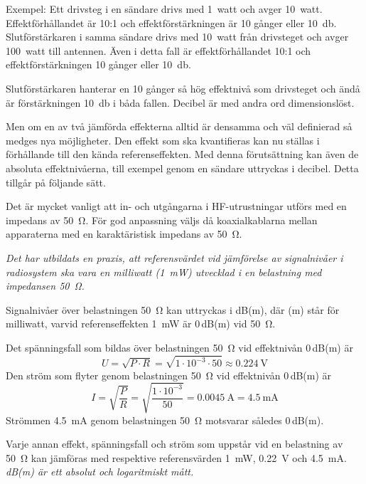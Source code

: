 Exempel: Ett drivsteg i en sändare drivs med 1~watt och avger 10~watt.
Effektförhållandet är 10:1 och effektförstärkningen är 10 gånger eller
\qty{10}{\decibel}.
Slutförstärkaren i samma sändare drivs med 10~watt från drivsteget och avger
100~watt till antennen.
Även i detta fall är effektförhållandet 10:1 och effektförstärkningen 10 gånger
eller \qty{10}{\decibel}.

Slutförstärkaren hanterar en 10 gånger så hög effektnivå som drivsteget och ändå
är förstärkningen \qty{10}{\decibel} i båda fallen.
Decibel är med andra ord dimensionslöst.

Men om en av två jämförda effekterna alltid är densamma och väl definierad så
medges nya möjligheter.
Den effekt som ska kvantifieras kan nu ställas i förhållande till den kända
referenseffekten.
Med denna förutsättning kan även de absoluta effektnivåerna, till exempel genom
en sändare uttryckas i decibel.
Detta tillgår på följande sätt.

Det är mycket vanligt att in- och utgångarna i HF-utrustningar utförs
med en impedans av \qty{50}{\ohm}.
För god anpassning väljs då koaxialkablarna mellan apparaterna med en
karaktäristisk impedans av \qty{50}{\ohm}.

\emph{Det har utbildats en praxis, att referensvärdet vid jämförelse
  av signalnivåer i radiosystem ska vara en milliwatt (\qty{1}{\milli\watt})
  utvecklad i en belastning med impedansen \qty{50}{\ohm}.}

Signalnivåer över belastningen \qty{50}{\ohm} kan uttryckas i dB(m), där (m)
står för milliwatt, varvid referenseffekten \qty{1}{\milli\watt} är 0\,dB(m) vid
\qty{50}{\ohm}.

Det spänningsfall som bildas över belastningen \qty{50}{\ohm} vid effektnivån
0\,dB(m) är
\[U = \sqrt{P\cdot R} = \sqrt{1\cdot 10^{-3} \cdot 50} \approx \qty{0.224}{\volt}\]
Den ström som flyter genom belastningen \qty{50}{\ohm} vid effektnivån 0\,dB(m)
är
\[
I = \sqrt{\frac{P}{R}} = \sqrt{\frac{1\cdot 10^{-3}}{50}} = \qty{0.0045}{\ampere} = \qty{4.5}{\milli\ampere}
\]
Strömmen \qty{4,5}{\milli\ampere} genom belastningen \qty{50}{\ohm} motsvarar
således 0\,dB(m).

Varje annan effekt, spänningsfall och ström som uppstår vid en belastning av
\qty{50}{\ohm} kan jämföras med respektive referensvärden \qty{1}{\milli\watt},
\qty{0,22}{\volt} och \qty{4,5}{\milli\ampere}.
\emph{dB(m) är ett absolut och logaritmiskt mått.}

